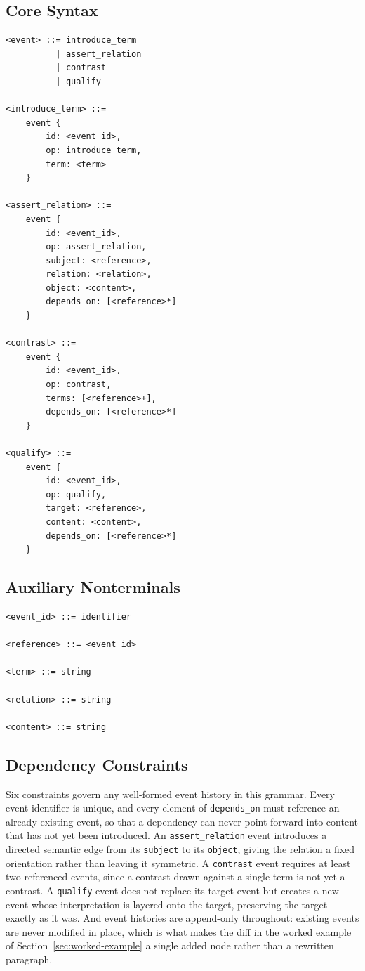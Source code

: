 \documentclass[11pt]{article}
\theoremstyle{definition}
\begin{document}
\subsection{Core Syntax}

\begin{verbatim}
<event> ::= introduce_term
          | assert_relation
          | contrast
          | qualify

<introduce_term> ::=
    event {
        id: <event_id>,
        op: introduce_term,
        term: <term>
    }

<assert_relation> ::=
    event {
        id: <event_id>,
        op: assert_relation,
        subject: <reference>,
        relation: <relation>,
        object: <content>,
        depends_on: [<reference>*]
    }

<contrast> ::=
    event {
        id: <event_id>,
        op: contrast,
        terms: [<reference>+],
        depends_on: [<reference>*]
    }

<qualify> ::=
    event {
        id: <event_id>,
        op: qualify,
        target: <reference>,
        content: <content>,
        depends_on: [<reference>*]
    }
\end{verbatim}

\subsection{Auxiliary Nonterminals}

\begin{verbatim}
<event_id> ::= identifier

<reference> ::= <event_id>

<term> ::= string

<relation> ::= string

<content> ::= string
\end{verbatim}

\subsection{Dependency Constraints}

Six constraints govern any well-formed event history in this grammar. Every event identifier is unique, and every element of \texttt{depends\_on} must reference an already-existing event, so that a dependency can never point forward into content that has not yet been introduced. An \texttt{assert\_relation} event introduces a directed semantic edge from its \texttt{subject} to its \texttt{object}, giving the relation a fixed orientation rather than leaving it symmetric. A \texttt{contrast} event requires at least two referenced events, since a contrast drawn against a single term is not yet a contrast. A \texttt{qualify} event does not replace its target event but creates a new event whose interpretation is layered onto the target, preserving the target exactly as it was. And event histories are append-only throughout: existing events are never modified in place, which is what makes the diff in the worked example of Section~\ref{sec:worked-example} a single added node rather than a rewritten paragraph.
\end{document}
